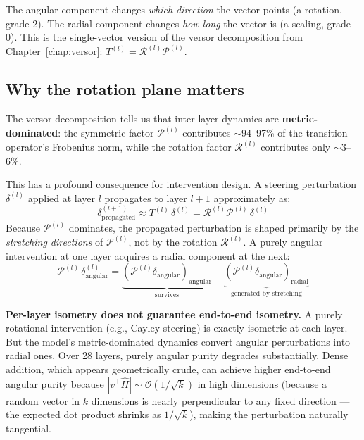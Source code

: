 \documentclass[11pt, twoside, openright]{memoir}
\newcommand{\rotor}[1]{\mathcal{R}^{(#1)}}  %
\newcommand{\metric}[1]{\mathcal{P}^{(#1)}} %
\begin{document}
\begin{transformer}
The angular component changes \emph{which direction} the vector points (a rotation, grade-2). The radial component changes \emph{how long} the vector is (a scaling, grade-0). This is the single-vector version of the versor decomposition from Chapter~\ref{chap:versor}: $T^{(l)} = \rotor{l}\metric{l}$.
\end{transformer}

\subsection{Why the rotation plane matters}

The versor decomposition tells us that inter-layer dynamics are
\textbf{metric-dominated}: the symmetric factor $\metric{l}$
contributes $\sim$94--97\% of the transition operator's Frobenius norm,
while the rotation factor $\rotor{l}$ contributes only $\sim$3--6\%.

This has a profound consequence for intervention design.  A steering
perturbation $\delta^{(l)}$ applied at layer $l$ propagates to layer
$l+1$ approximately as:
\[
  \delta_{\text{propagated}}^{(l+1)} \approx
  T^{(l)} \, \delta^{(l)} = \rotor{l} \metric{l} \, \delta^{(l)}
\]
Because $\metric{l}$ dominates, the propagated perturbation is shaped
primarily by the \emph{stretching directions} of $\metric{l}$, not
by the rotation $\rotor{l}$.  A purely angular intervention at one
layer acquires a radial component at the next:
\[
  \metric{l}\,\delta_{\text{angular}}^{(l)} =
  \underbrace{(\metric{l}\delta_{\text{angular}})_{\text{angular}}}_{\text{survives}}
  + \underbrace{(\metric{l}\delta_{\text{angular}})_{\text{radial}}}_{\text{generated by stretching}}
\]

\begin{pitfall}
\textbf{Per-layer isometry does not guarantee end-to-end isometry.}
A purely rotational intervention (e.g., Cayley steering) is exactly
isometric at each layer.  But the model's metric-dominated dynamics
convert angular perturbations into radial ones.  Over 28 layers,
purely angular purity degrades substantially.  Dense addition, which
appears geometrically crude, can achieve higher end-to-end angular
purity because $|v^\top \hat{H}| \sim \mathcal{O}(1/\sqrt{k})$ in
high dimensions (because a random vector in $k$ dimensions is nearly perpendicular to any fixed direction --- the expected dot product shrinks as $1/\sqrt{k}$), making the perturbation naturally tangential.
\end{pitfall}
\end{document}
